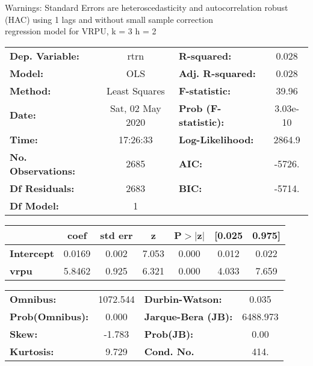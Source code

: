 Warnings: \newline
 [1] Standard Errors are heteroscedasticity and autocorrelation robust (HAC) using 1 lags and without small sample correction\\ 

regression model for VRPU, k = 3 h = 2\begin{center}
\begin{tabular}{lclc}
\toprule
\textbf{Dep. Variable:}    &       rtrn       & \textbf{  R-squared:         } &     0.028   \\
\textbf{Model:}            &       OLS        & \textbf{  Adj. R-squared:    } &     0.028   \\
\textbf{Method:}           &  Least Squares   & \textbf{  F-statistic:       } &     39.96   \\
\textbf{Date:}             & Sat, 02 May 2020 & \textbf{  Prob (F-statistic):} &  3.03e-10   \\
\textbf{Time:}             &     17:26:33     & \textbf{  Log-Likelihood:    } &    2864.9   \\
\textbf{No. Observations:} &        2685      & \textbf{  AIC:               } &    -5726.   \\
\textbf{Df Residuals:}     &        2683      & \textbf{  BIC:               } &    -5714.   \\
\textbf{Df Model:}         &           1      & \textbf{                     } &             \\
\bottomrule
\end{tabular}
\begin{tabular}{lcccccc}
                   & \textbf{coef} & \textbf{std err} & \textbf{z} & \textbf{P$> |$z$|$} & \textbf{[0.025} & \textbf{0.975]}  \\
\midrule
\textbf{Intercept} &       0.0169  &        0.002     &     7.053  &         0.000        &        0.012    &        0.022     \\
\textbf{vrpu}      &       5.8462  &        0.925     &     6.321  &         0.000        &        4.033    &        7.659     \\
\bottomrule
\end{tabular}
\begin{tabular}{lclc}
\textbf{Omnibus:}       & 1072.544 & \textbf{  Durbin-Watson:     } &    0.035  \\
\textbf{Prob(Omnibus):} &   0.000  & \textbf{  Jarque-Bera (JB):  } & 6488.973  \\
\textbf{Skew:}          &  -1.783  & \textbf{  Prob(JB):          } &     0.00  \\
\textbf{Kurtosis:}      &   9.729  & \textbf{  Cond. No.          } &     414.  \\
\bottomrule
\end{tabular}
\end{center}

